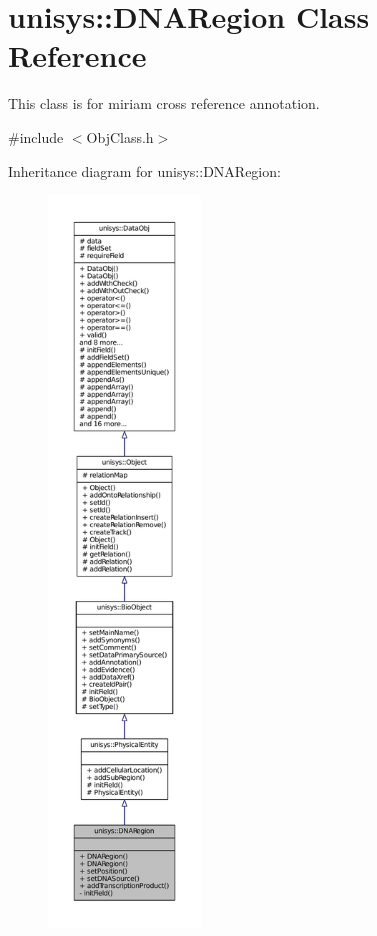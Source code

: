 \hypertarget{classunisys_1_1DNARegion}{\section{unisys\-:\-:D\-N\-A\-Region Class Reference}
\label{classunisys_1_1DNARegion}
}


This class is for miriam cross reference annotation.  




{\ttfamily \#include $<$Obj\-Class.\-h$>$}



Inheritance diagram for unisys\-:\-:D\-N\-A\-Region\-:
\nopagebreak
\begin{figure}[H]
\begin{center}
\leavevmode
\includegraphics[height=550pt]{classunisys_1_1DNARegion__inherit__graph}
\end{center}
\end{figure}


